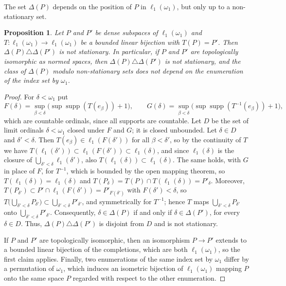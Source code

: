 \documentclass[12pt]{article}
\newtheorem{proposition}[theorem]{Proposition}
\newcommand{\ellone}[1]{\ell_1(#1)}
\newcommand{\supp}{\operatorname{supp}}
\begin{document}
The set $\Delta(P)$ depends on the position of $P$ in $\ellone{\omega_1}$,
but only up to a non-stationary set.

\begin{proposition}\label{InvarianceOfDelta} Let $P$ and $P'$ be dense
    subspaces of $\ellone{\omega_1}$ and $T:\ellone{\omega_1}\to\ellone{\omega_1}$
    be a bounded linear bijection with $T(P)=P'$. Then
    $\Delta(P)\triangle\Delta(P')$ is not stationary. In particular, if $P$
    and $P'$ are topologically isomorphic as normed spaces, then
    $\Delta(P)\triangle\Delta(P')$ is not stationary, and the class of
    $\Delta(P)$ modulo non-stationary sets does not depend on the enumeration
    of the index set by $\omega_1$.
\end{proposition}
\begin{proof} For $\delta<\omega_1$ put
    \[
    F(\delta)=\sup_{\beta<\delta}\bigl(\sup\supp(T(e_\beta))+1\bigr),\qquad
    G(\delta)=\sup_{\beta<\delta}\bigl(\sup\supp(T^{-1}(e_\beta))+1\bigr),
    \]
    which are countable ordinals, since all supports are countable. Let $D$
    be the set of limit ordinals $\delta<\omega_1$ closed under $F$ and $G$;
    it is closed unbounded. Let $\delta\in D$ and $\delta'<\delta$. Then
    $T(e_\beta)\in\ellone{F(\delta')}$ for all $\beta<\delta'$, so by the
    continuity of $T$ we have $T(\ellone{\delta'})\subset\ellone{F(\delta')}
    \subset\ellone{\delta}$, and since $\ellone{\delta}$ is the closure of
    $\bigcup_{\delta'<\delta}\ellone{\delta'}$, also
    $T(\ellone{\delta})\subset\ellone{\delta}$. The same holds, with $G$ in place of $F$, for $T^{-1}$, which is bounded by
    the open mapping theorem, so $T(\ellone{\delta})=\ellone{\delta}$ and
    $T(P_\delta)=T(P)\cap T(\ellone{\delta})=P'_\delta$. Moreover,
    $T(P_{\delta'})\subset P'\cap\ellone{F(\delta')}=P'_{F(\delta')}$ with
    $F(\delta')<\delta$, so
    $T\bigl(\bigcup_{\delta'<\delta}P_{\delta'}\bigr)\subset
    \bigcup_{\delta'<\delta}P'_{\delta'}$, and symmetrically for $T^{-1}$;
    hence $T$ maps $\bigcup_{\delta'<\delta}P_{\delta'}$ onto
    $\bigcup_{\delta'<\delta}P'_{\delta'}$. Consequently, $\delta\in\Delta(P)$
    if and only if $\delta\in\Delta(P')$, for every $\delta\in D$. Thus,
    $\Delta(P)\triangle\Delta(P')$ is disjoint from $D$ and is not
    stationary.

    If $P$ and $P'$ are topologically isomorphic, then an isomorphism
    $P\to P'$ extends to a bounded linear bijection of the completions, which
    are both $\ellone{\omega_1}$, so the first claim applies. Finally, two
    enumerations of the same index set by $\omega_1$ differ by a permutation
    of $\omega_1$, which induces an isometric bijection of
    $\ellone{\omega_1}$ mapping $P$ onto the same space $P$ regarded with
    respect to the other enumeration.
\end{proof}
\end{document}

